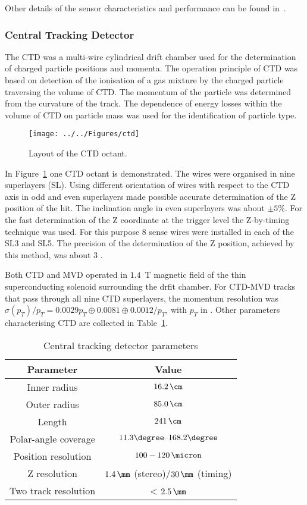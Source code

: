 Other details of the sensor characteristics and performance can be found in~\cite{tech:mvd:prc9701}.

\subsubsection{Central Tracking Detector}
\label{subsubsec:ctd}
The CTD was a multi-wire cylindrical drift chamber used for the determination of charged particle positions and momenta. The operation principle of CTD was based on detection of the ionisation of a gas mixture by the charged particle traversing the volume of CTD. The momentum of the particle was determined from the curvature of the track. The dependence of energy losses within the volume of CTD on particle mass was used for the identification of particle type.
\begin{figure}[htpb]
	\centering
		\texttt{[image: ../../Figures/ctd]}
	\caption{Layout of the CTD octant.}
	\label{fig:ctd}
\end{figure}
In Figure~\ref{fig:ctd} one CTD octant is demonstrated. The wires were organised in nine superlayers (SL). Using different orientation of wires with respect to the CTD axis in odd and even superlayers made possible accurate determination of the Z position of the hit. The inclination angle in even superlayers was about $\pm 5\%$. For the fast determination of the Z coordinate at the trigger level the Z-by-timing technique was used. For this purpose 8 sense wires were installed in each of the SL3 and SL5. The precision of the determination of the Z position, achieved by this method, was about 3 \cm.

Both CTD and MVD operated in $1.4$~T magnetic field of the thin superconducting solenoid surrounding the drfit chamber. For CTD-MVD tracks that pass through all nine CTD superlayers, the momentum resolution was $\sigma(p_{T})/p_{T} = 0.0029 p_{T} \oplus 0.0081 \oplus
0.0012/p_{T}$, with $p_{T}$ in \GeV. Other parameters characterising CTD are collected in Table~\ref{tab:ctdgeomparameters}.

\begin{table}[htbp]
\begin{tabular}{ | c | c | }
     \hline
      Parameter & Value \\
			\hline
			\hline
			Inner radius & $16.2\,\cm$ \\ \hline
      Outer radius & $85.0\,\cm$  \\ \hline
			Length & $241\,\cm$ \\ \hline 
			Polar-angle coverage & $11.3\degree \mbox{--} 168.2\degree$ \\ \hline
			Position resolution & $100-120\,\micron$ \\ \hline
			Z resolution & $1.4\,\mm$ (stereo)/$30\,\mm$ (timing) \\ \hline
			Two track resolution & < $2.5\,\mm$ \\
      \hline
     \end{tabular}
	\caption{Central tracking detector parameters}
	\label{tab:ctdgeomparameters}
\end{table}
